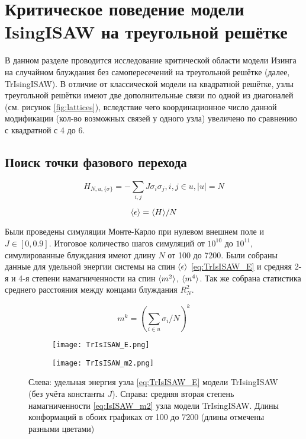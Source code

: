 \section{Критическое поведение модели IsingISAW на треугольной решётке}

В данном разделе проводится исследование критической области модели Изинга на случайном блуждания без самопересечений на треугольной решётке (далее, TrIsingISAW).
В отличие от классической модели на квадратной решётке, узлы треугольной решётки имеют две дополнительные связи по одной из диагоналей (см. рисунок \ref{fig:lattices}), 
вследствие чего координационное число данной модификации (кол-во возможных связей у одного узла) увеличено по сравнению с квадратной с 4 до 6.

\subsection{Поиск точки фазового перехода}

\begin{equation}
\label{eq:IsISAW_H}
 H_{N,u,\{\sigma\}} = -\sum_{i,j} J\sigma_i \sigma_j, i,j \in u, |u| = N
\end{equation}

\begin{equation}
\label{eq:TrIsISAW_E}
\langle \epsilon \rangle = \langle H \rangle / N
\end{equation}

Были проведены симуляции Монте-Карло при нулевом внешнем поле и $J \in [0,0.9]$. 
Итоговое количество шагов симуляций от $10^10$ до $10^11$, симулированные блуждания имеют длину $N$ от 100 до 7200.
Были собраны данные для удельной энергии системы на спин $\langle \epsilon \rangle$ \eqref{eq:TrIsISAW_E} и средняя 2-я и 4-я степени намагниченности на спин $\langle m^2 \rangle$, $\langle m^4 \rangle$.
Так же собрана статистика среднего расстояния между концами блуждания $R^2_N$.

\begin{equation}
\label{eq:IsISAW_m2}
	m^{k} = (\sum_{i \in u} \sigma_i / N)^k
\end{equation}

\begin{figure}[h]
\begin{subfigure}{0.49\textwidth}
\texttt{[image: TrIsISAW\_E.png]}
\caption{}
\label{fig:TrIsISAW_E}
\end{subfigure}
\hfill
\begin{subfigure}{0.49\textwidth}
\texttt{[image: TrIsISAW\_m2.png]}
\caption{}
\label{fig:TrIsISAW_m2}
\end{subfigure}
\caption{Слева: удельная энергия узла \eqref{eq:TrIsISAW_E} модели TrIsingISAW (без учёта константы $J$).
Справа: средняя вторая степень намагниченности \eqref{eq:IsISAW_m2} узла модели TrIsingISAW. 
Длины конформаций в обоих графиках от 100 до 7200 (длины отмечены разными цветами)}

\end{figure}

